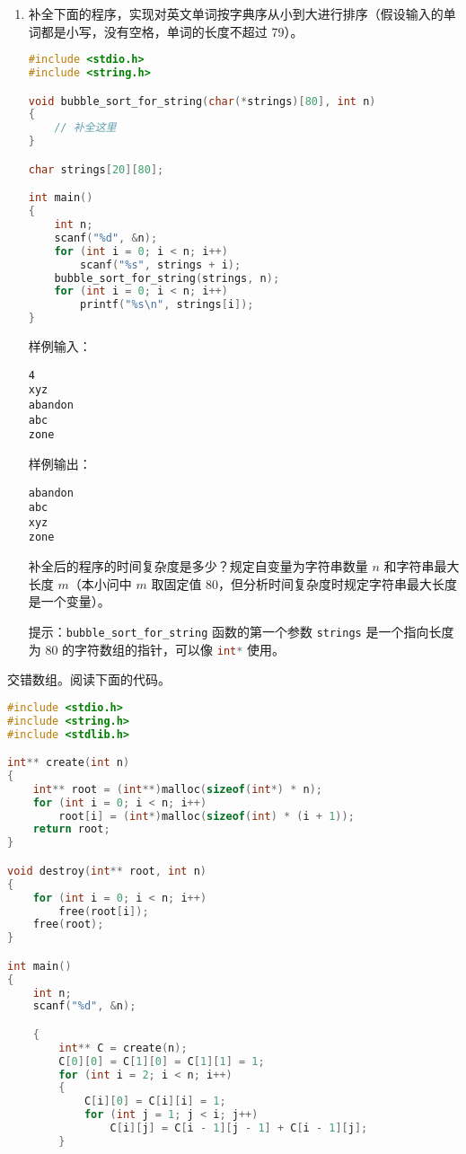 \begin{problemset}
\begin{enumerate}
		\item 补全下面的程序，实现对英文单词按字典序从小到大进行排序（假设输入的单词都是小写，没有空格，单词的长度不超过 79）。

		\begin{lstlisting}[language=c, moreemph={[2]bubble_sort_for_string}]
#include <stdio.h>
#include <string.h>

void bubble_sort_for_string(char(*strings)[80], int n)
{
	// 补全这里
}

char strings[20][80];

int main()
{
	int n;
	scanf("%d", &n);
	for (int i = 0; i < n; i++)
		scanf("%s", strings + i);
	bubble_sort_for_string(strings, n);
	for (int i = 0; i < n; i++)
		printf("%s\n", strings[i]);
}
		\end{lstlisting}

		样例输入：
		\begin{lstlisting}[numbers=none]
4
xyz
abandon
abc
zone
		\end{lstlisting}

		样例输出：
		\begin{lstlisting}[numbers=none]
abandon
abc
xyz
zone
		\end{lstlisting}

		补全后的程序的时间复杂度是多少？规定自变量为字符串数量 $n$ 和字符串最大长度 $m$（本小问中 $m$ 取固定值 80，但分析时间复杂度时规定字符串最大长度是一个变量）。

		提示：\lstinline[language=c, moreemph={[2]bubble_sort_for_string}]{bubble_sort_for_string} 函数的第一个参数 \lstinline{strings} 是一个指向长度为 80 的字符数组的指针，可以像 \lstinline[language=c]{int*} 使用。
	\end{enumerate}

	\item 交错数组。阅读下面的代码。

	\begin{lstlisting}[language=c, moreemph={[2]create, destroy, malloc, free}]
#include <stdio.h>
#include <string.h>
#include <stdlib.h>

int** create(int n)
{
	int** root = (int**)malloc(sizeof(int*) * n);
	for (int i = 0; i < n; i++)
		root[i] = (int*)malloc(sizeof(int) * (i + 1));
	return root;
}

void destroy(int** root, int n)
{
	for (int i = 0; i < n; i++)
		free(root[i]);
	free(root);
}

int main()
{
	int n;
	scanf("%d", &n);

	{
		int** C = create(n);
		C[0][0] = C[1][0] = C[1][1] = 1;
		for (int i = 2; i < n; i++)
		{
			C[i][0] = C[i][i] = 1;
			for (int j = 1; j < i; j++)
				C[i][j] = C[i - 1][j - 1] + C[i - 1][j];
		}


\end{lstlisting}
\end{problemset}
